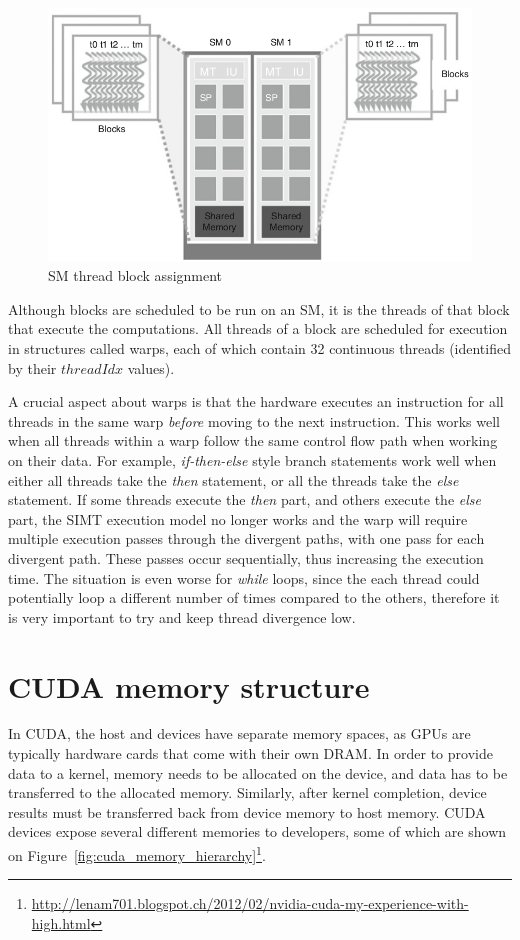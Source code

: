 \documentclass[12pt, a4paper]{report}
\begin{document}
\begin{figure}[h]
\centering
\includegraphics[scale=0.4]{figs/sm_thread_block_assignment}
\caption{SM thread block assignment}
\label{fig:sm_thread_block_assignment}
\end{figure}

Although blocks are scheduled to be run on an SM, it is the threads of that
block that execute the computations.
All threads of a block are scheduled for execution in structures called warps,
each of which contain 32 continuous threads (identified by their $threadIdx$
values).

A crucial aspect about warps is that the hardware executes an instruction for
all threads in the same warp \emph{before} moving to the next instruction.
This works well when all threads within a warp follow the same control flow path
when working on their data.
For example, \emph{if-then-else} style branch statements work well when either
all threads take the \emph{then} statement, or all the threads take the
\emph{else} statement.
If some threads execute the \emph{then} part, and others execute the \emph{else}
part, the SIMT execution model no longer works and the warp will require
multiple execution passes through the divergent paths, with one pass for each
divergent path.
These passes occur sequentially, thus increasing the execution time.
The situation is even worse for \emph{while} loops, since the each thread could
potentially loop a different number of times compared to the others, therefore
it is very important to try and keep thread divergence low.

\section{CUDA memory structure}
In CUDA, the host and devices have separate memory spaces, as GPUs are typically
hardware cards that come with their own DRAM.
In order to provide data to a kernel, memory needs to be allocated on the
device, and data has to be transferred to the allocated memory.
Similarly, after kernel completion, device results must be transferred back from
device memory to host memory.
CUDA devices expose several different memories to developers, some of which are
shown on Figure~\ref{fig:cuda_memory_hierarchy}\footnote{\url{http://lenam701.blogspot.ch/2012/02/nvidia-cuda-my-experience-with-high.html}}.
\end{document}
